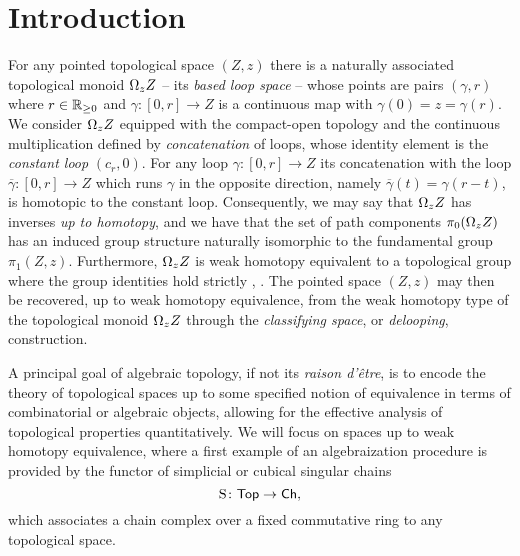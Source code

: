 
\section{Introduction}

For any pointed topological space $(Z,z)$ there is a naturally associated topological monoid $\Omega_z Z$ -- its \textit{based loop space} -- whose points are pairs $(\gamma, r)$ where $r \in \mathbb{R}_{\geq 0}$ and $\gamma \colon [0,r] \to Z$ is a continuous map with $\gamma(0) = z = \gamma(r)$.
We consider $\Omega_z Z$  equipped with the compact-open topology and the continuous multiplication defined by \textit{concatenation} of loops, whose identity element is the \textit{constant loop} $(c_r,0)$.
For any loop $\gamma \colon [0,r] \to Z $ its concatenation with the loop $\overline{\gamma} \colon [0,r] \to Z$ which runs $\gamma$ in the opposite direction, namely $\overline{\gamma}(t) = \gamma(r-t)$, is homotopic to the constant loop.
Consequently, we may say that $\Omega_z Z$ has inverses \textit{up to homotopy}, and we have that the set of path components $\pi_0(\Omega_z Z)$ has an induced group structure naturally isomorphic to the fundamental group $\pi_1(Z,z)$.
Furthermore, $\Omega_z Z$ is weak homotopy equivalent to a topological group where the group identities hold strictly \cite{milnor1956bundles}, \cite{berger1995loops}.
The pointed space $(Z,z)$ may then be recovered, up to weak homotopy equivalence, from the weak homotopy type of the topological monoid $\Omega_z Z$ through the \textit{classifying space}, or \textit{delooping}, construction.

A principal goal of algebraic topology, if not its \textit{raison d'\^{e}tre}, is to encode the theory of topological spaces up to some specified notion of equivalence in terms of combinatorial or algebraic objects, allowing for the effective analysis of topological properties quantitatively.
We will focus on spaces up to weak homotopy equivalence, where a first example of an algebraization procedure is provided by the functor of simplicial or cubical singular chains
\[
\operatorname{S} \colon \mathsf{Top} \to \mathsf{Ch},
\]
which associates a chain complex over a fixed commutative ring to any topological space.


